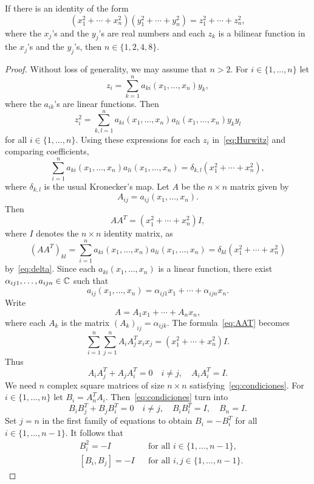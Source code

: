 \begin{theorem}[Hurwitz]
    \label{thm:Hurwitz}
	If there is an identity of the form 
	\begin{equation}
		\label{eq:Hurwitz}
		(x_1^2+\cdots+x_n^2)(y_1^2+\cdots+y_n^2)=z_1^2+\cdots+z_n^2,
	\end{equation}
	where the $x_j$'s and the $y_j$'s are real numbers and
	each $z_k$ is a bilinear function in the $x_j$'s and the $y_j$'s, then 
	$n\in\{1,2,4,8\}$.
\end{theorem}

\begin{proof}
    Without loss of generality, we may assume that $n>2$.  For 
	$i\in\{1,\dots,n\}$ let  
	\[
		z_i=\sum_{k=1}^n a_{ki}(x_1,\dots,x_n)y_k,
	\]
	where the $a_{ik}$'s are linear functions. Then 
	\[
		z_i^2=\sum_{k,l=1}^na_{ki}(x_1,\dots,x_n)a_{li}(x_1,\dots,x_n)y_ky_l
	\]
	for all $i\in\{1,\dots,n\}$. Using these expressions for each $z_i$
	in~\eqref{eq:Hurwitz} and comparing coefficients, 
	\begin{equation}
		\label{eq:delta}
		\sum_{i=1}^n a_{ki}(x_1,\dots,x_n)a_{li}(x_1,\dots,x_n)=\delta_{k,l}(x_1^2+\cdots+x_n^2),
	\end{equation}
	where $\delta_{k,l}$ is the usual Kronecker's map. Let 
	$A$ be the $n\times n$ matrix given by 
	\[
	A_{ij}=a_{ij}(x_1,\dots,x_n).
	\]
	Then 
	\begin{equation}
		\label{eq:AAT}
		AA^T=(x_1^2+\cdots+x_n^2)I,
	\end{equation}
	where $I$ denotes the $n\times n$ identity matrix, 
	as 
	\[
		(AA^T)_{kl}=\sum_{i=1}^na_{ki}(x_1,\dots,x_n)a_{li}(x_1,\dots,x_n)=\delta_{kl}(x_1^2+\cdots+x_n^2)
	\]
	by~\eqref{eq:delta}. Since each $a_{ki}(x_1,\dots,x_n)$ is a linear function, 
	there exist $\alpha_{ij1},\dots,a_{ijn}\in\mathbb{C}$ such that 
	\[
		a_{ij}(x_1,\dots,x_n)=\alpha_{ij1}x_1+\cdots+\alpha_{ijn}x_n.
	\]
	Write 
	\[
		A=A_1x_1+\cdots+A_nx_n,
	\]
	where each $A_k$ is the matrix $(A_k)_{ij}=\alpha_{ijk}$. 
	The formula~\eqref{eq:AAT} becomes
	\[
		\sum_{i=1}^n\sum_{j=1}^nA_iA_j^Tx_ix_j=(x_1^2+\cdots+x_n^2)I.
	\]
	Thus 
	\begin{equation}
		\label{eq:condiciones}
		A_iA_j^T+A_jA_i^T=0\quad i\ne j,\quad
		A_iA_i^T=I.
	\end{equation}
	We need $n$ complex square matrices of size $n\times n$
	satisfying~\eqref{eq:condiciones}. For $i\in\{1,\dots,n\}$ let  
	$B_i=A_n^TA_i$. Then~\eqref{eq:condiciones} turn into  
	\[
		B_iB_j^T+B_jB_i^T=0\quad i\ne j,\quad
		B_iB_i^T=I,\quad
		B_n=I.
	\]
	Set $j=n$ in the first family of equations to obtain $B_i=-B_i^T$ for all 
	$i\in\{1,\dots,n-1\}$. It follows that 
	\begin{equation}
	\label{eq:representation}
	\begin{aligned}
	    &B_i^2=-I && \text{for all $i\in\{1,\dots,n-1\}$},\\
	    &[B_i,B_j]=-I && \text{for all $i,j\in\{1,\dots,n-1\}$.}
	\end{aligned}
	\end{equation}
    

\end{proof}
